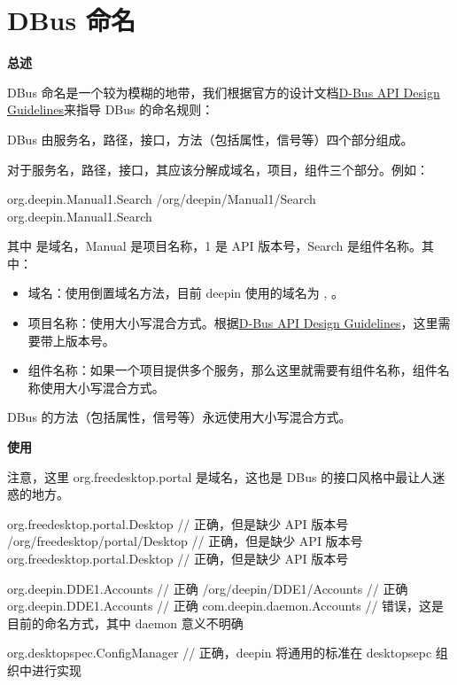 \section{DBus 命名}

\textbf{总述}

DBus 命名是一个较为模糊的地带，我们根据官方的设计文档\href{https://dbus.freedesktop.org/doc/dbus-api-design.html}{D-Bus API Design Guidelines}来指导 DBus 的命名规则：

DBus 由服务名，路径，接口，方法（包括属性，信号等）四个部分组成。

对于服务名，路径，接口，其应该分解成域名，项目，组件三个部分。例如：

\begin{cppcode}
  org.deepin.Manual1.Search
  /org/deepin/Manual1/Search
  org.deepin.Manual1.Search
\end{cppcode}

其中  是域名，Manual 是项目名称，1 是 API 版本号，Search 是组件名称。其中：

\begin{itemize}
  \item 域名：使用倒置域名方法，目前 deepin 使用的域名为 ,  。
  \item 项目名称：使用大小写混合方式。根据\href{https://dbus.freedesktop.org/doc/dbus-api-design.html}{D-Bus API Design Guidelines}，这里需要带上版本号。
  \item 组件名称：如果一个项目提供多个服务，那么这里就需要有组件名称，组件名称使用大小写混合方式。
\end{itemize}

DBus 的方法（包括属性，信号等）永远使用大小写混合方式。

\textbf{使用}

注意，这里 org.freedesktop.portal 是域名，这也是 DBus 的接口风格中最让人迷惑的地方。

\begin{cppcode}
  org.freedesktop.portal.Desktop      // 正确，但是缺少 API 版本号
  /org/freedesktop/portal/Desktop     // 正确，但是缺少 API 版本号
  org.freedesktop.portal.Desktop      // 正确，但是缺少 API 版本号
\end{cppcode}

\begin{cppcode}
  org.deepin.DDE1.Accounts       // 正确
  /org/deepin/DDE1/Accounts      // 正确
  org.deepin.DDE1.Accounts       // 正确
  com.deepin.daemon.Accounts     // 错误，这是目前的命名方式，其中 daemon 意义不明确

  org.desktopspec.ConfigManager  // 正确，deepin 将通用的标准在 desktopsepc 组织中进行实现
\end{cppcode}


